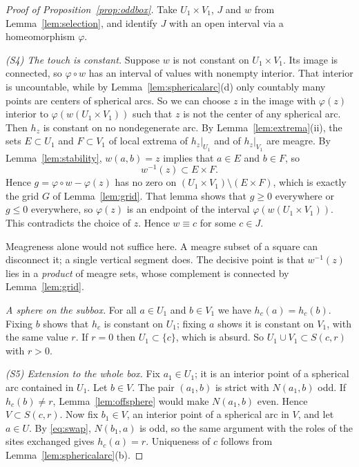 \documentclass[11pt]{amsart}
\theoremstyle{definition}
\theoremstyle{remark}
\newcommand{\N}{N}
\begin{document}
\begin{proof}[Proof of Proposition~\ref{prop:oddbox}]
Take $U_1\times V_1$, $J$ and $w$ from Lemma~\ref{lem:selection}, and identify $J$ with an open interval via a homeomorphism $\varphi$.

\emph{(S4) The touch is constant.} Suppose $w$ is not constant on $U_1\times V_1$. Its image is connected, so $\varphi\circ w$ has an interval of values with nonempty interior. That interior is uncountable, while by Lemma~\ref{lem:sphericalarc}(d) only countably many points are centers of spherical arcs. So we can choose $z$ in the image with $\varphi(z)$ interior to $\varphi(w(U_1\times V_1))$ such that $z$ is not the center of any spherical arc. Then $h_z$ is constant on no nondegenerate arc. By Lemma~\ref{lem:extrema}(ii), the sets $E\subset U_1$ and $F\subset V_1$ of local extrema of $h_z|_{U_1}$ and of $h_z|_{V_1}$ are meagre. By Lemma~\ref{lem:stability}, $w(a,b)=z$ implies that $a\in E$ and $b\in F$, so
\[
  w^{-1}(z)\subset E\times F .
\]
Hence $g=\varphi\circ w-\varphi(z)$ has no zero on $(U_1\times V_1)\setminus(E\times F)$, which is exactly the grid $G$ of Lemma~\ref{lem:grid}. That lemma shows that $g\ge0$ everywhere or $g\le0$ everywhere, so $\varphi(z)$ is an endpoint of the interval $\varphi(w(U_1\times V_1))$. This contradicts the choice of $z$. Hence $w\equiv c$ for some $c\in J$.

Meagreness alone would not suffice here. A meagre subset of a square can disconnect it; a single vertical segment does. The decisive point is that $w^{-1}(z)$ lies in a \emph{product} of meagre sets, whose complement is connected by Lemma~\ref{lem:grid}.

\emph{A sphere on the subbox.} For all $a\in U_1$ and $b\in V_1$ we have $h_c(a)=h_c(b)$. Fixing $b$ shows that $h_c$ is constant on $U_1$; fixing $a$ shows it is constant on $V_1$, with the same value $r$. If $r=0$ then $U_1\subset\{c\}$, which is absurd. So $U_1\cup V_1\subset S(c,r)$ with $r>0$.

\emph{(S5) Extension to the whole box.} Fix $a_1\in U_1$; it is an interior point of a spherical arc contained in $U_1$. Let $b\in V$. The pair $(a_1,b)$ is strict with $\N(a_1,b)$ odd. If $h_c(b)\ne r$, Lemma~\ref{lem:offsphere} would make $\N(a_1,b)$ even. Hence $V\subset S(c,r)$. Now fix $b_1\in V$, an interior point of a spherical arc in $V$, and let $a\in U$. By \eqref{eq:swap}, $\N(b_1,a)$ is odd, so the same argument with the roles of the sites exchanged gives $h_c(a)=r$. Uniqueness of $c$ follows from Lemma~\ref{lem:sphericalarc}(b).
\end{proof}
\end{document}

